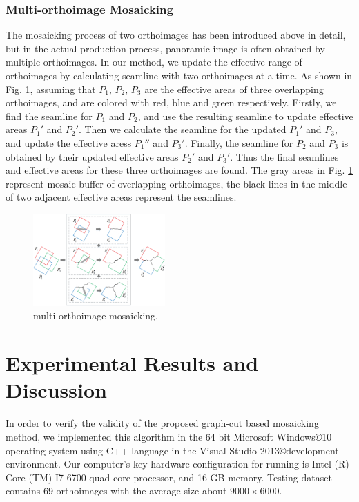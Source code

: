 \documentclass[journal]{IEEEtran}
\begin{document}
\subsubsection{Multi-orthoimage Mosaicking}
The mosaicking process of two orthoimages has been introduced above in detail, but in the actual production process, panoramic image is often obtained by multiple orthoimages. In our method, we update the effective range of orthoimages by calculating seamline with two orthoimages at a time. As shown in Fig. \ref{fig:multi-orthoimage-mosaic}, assuming that $P_1$, $P_2$, $P_3$ are the effective areas of three overlapping orthoimages, and are colored with red, blue and green respectively. Firstly, we find the seamline for $P_1$ and $P_2$, and use the resulting seamline to update effective areas ${P_1}'$ and ${P_2}'$. Then we calculate the seamline for the updated ${P_1}'$ and $P_3$, and update the effective aress ${P_1}''$ and ${P_3}'$. Finally, the seamline for $P_2$ and $P_3$ is obtained by their updated effective areas ${P_2}'$ and ${P_3}'$. Thus the final seamlines and effective areas for these three orthoimages are found. The gray areas in Fig. \ref{fig:multi-orthoimage-mosaic} represent mosaic buffer of overlapping orthoimages, the black lines in the middle of two adjacent effective areas represent the seamlines.
\begin{figure}[!t]
	\centering
	\includegraphics[width=0.45\textwidth]{mosaicking}
	\caption{multi-orthoimage mosaicking.}
	\label{fig:multi-orthoimage-mosaic}
\end{figure}

\section{Experimental Results and Discussion}
In order to verify the validity of the proposed graph-cut based mosaicking method, we implemented this algorithm in the 64 bit Microsoft Windows\copyright 10 operating system using C++ language in the Visual Studio 2013\copyright development environment. Our computer's key hardware configuration for running is Intel (R) Core (TM) I7 6700 quad core processor, and 16 GB memory. Testing dataset contains 69 orthoimages with the average size about $9000\times 6000$.
\end{document}
